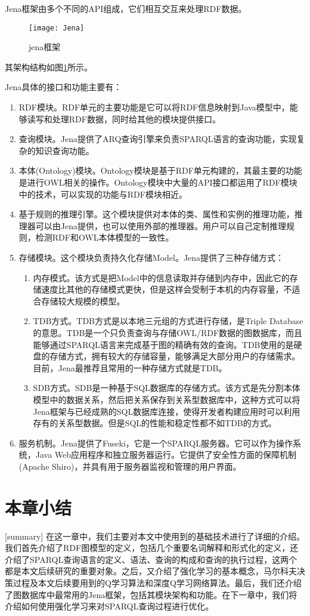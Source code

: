 Jena框架由多个不同的API组成，它们相互交互来处理RDF数据。
\begin{figure}[h]
    \centering
    \texttt{[image: Jena]}
    \caption{jena框架}
    \label{Jena}
\end{figure}
其架构结构如图\ref{Jena}所示。

Jena具体的接口和功能主要有：
\begin{enumerate}
    \item RDF模块。RDF单元的主要功能是它可以将RDF信息映射到Java模型中，能够读写和处理RDF数据，同时给其他的模块提供接口。
    \item 查询模块。Jena提供了ARQ查询引擎来负责SPARQL语言的查询功能，实现复杂的知识查询功能。
    \item 本体(Ontology)模块。Ontology模块是基于RDF单元构建的，其最主要的功能是进行OWL相关的操作。Ontology模块中大量的API接口都运用了RDF模块中的技术，可以实现的功能与RDF模块相近。
    \item 基于规则的推理引擎。这个模块提供对本体的类、属性和实例的推理功能，推理器可以由Jena提供，也可以使用外部的推理器。用户可以自己定制推理规则，检测RDF和OWL本体模型的一致性。
    \item 存储模块。这个模块负责持久化存储Model。Jena提供了三种存储方式：
    \begin{enumerate}
        \item 内存模式。该方式是把Model中的信息读取并存储到内存中，因此它的存储速度比其他的存储模式更快，但是这样会受制于本机的内存容量，不适合存储较大规模的模型。
        \item TDB方式。TDB方式是以本地三元组的方式进行存储，是Triple Database的意思。TDB是一个只负责查询与存储OWL/RDF数据的图数据库，而且能够通过SPARQL语言来完成基于图的精确有效的查询。TDB使用的是硬盘的存储方式，拥有较大的存储容量，能够满足大部分用户的存储需求。目前，Jena最推荐且常用的一种存储方式就是TDB。
        \item SDB方式。SDB是一种基于SQL数据库的存储方式。该方式是先分割本体模型中的数据关系，然后把关系保存到关系型数据库中，这种方式可以将Jena框架与已经成熟的SQL数据库连接，使得开发者构建应用时可以利用存有的关系型数据。但是SQL的性能和稳定性都不如TDB的方式。
    \end{enumerate}
    \item 服务机制。Jena提供了Fuseki，它是一个SPARQL服务器。它可以作为操作系统，Java Web应用程序和独立服务器运行。它提供了安全性方面的保障机制(Apache Shiro)，并具有用于服务器监视和管理的用户界面。
\end{enumerate}

\section{本章小结}[summary]
在这一章中，我们主要对本文中使用到的基础技术进行了详细的介绍。我们首先介绍了RDF图模型的定义，包括几个重要名词解释和形式化的定义，还介绍了SPARQL查询语言的定义、语法、查询的构成和查询的执行过程，这两个都是本文后续研究的重要对象。之后，又介绍了强化学习的基本概念，马尔科夫决策过程及本文后续要用到的Q学习算法和深度Q学习网络算法。最后，我们还介绍了图数据库中最常用的Jena框架，包括其模块架构和功能。在下一章中，我们将介绍如何使用强化学习来对SPARQL查询过程进行优化。

